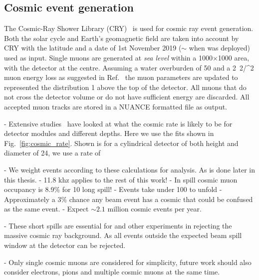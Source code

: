 \subsection{Cosmic event generation} %
\label{sec:chips_monte_carlo_cosmic} %

The Cosmic-Ray Shower Library (CRY)~\cite{hagmann2012_1, hagmann2012_2} is used for cosmic ray
event generation. Both the solar cycle and Earth's geomagnetic field are taken into account by CRY
with the \chipsfive latitude and a date of 1st November 2019 ($\sim$ when \chipsfive was deployed)
used as input. Single muons are generated at \emph{sea level} within a
\unit{1000}{}$\times$\unit{1000}{} area, with the detector at the centre.
Assuming a \chipsfive water overburden of \unit{50}{} and a
\unit{2.2}{\MeV/^{2}} muon energy loss as suggested in Ref.~\cite{klimushin2001} the
muon parameters are updated to represented the distribution \unit{1}{} above the top of
the detector. All muons that do not cross the detector volume or do not have sufficient energy are
discarded. All accepted muon tracks are stored in a NUANCE formatted file as output.

- Extensive studies~\cite{son2013} have looked at what the cosmic rate is likely to be for \chips
detector modules and different depths. Here we use the fits shown in Fig.~\ref{fig:cosmic_rate}.
Shown is for a cylindrical detector of both height and diameter of \unit{24}{}, we use a
rate of

- We weight events according to these calculations for analysis. As is done later in this thesis.
- 11.8 khz applies to the rest of this work!
- In spill cosmic muon occupancy is 8.9\% for \unit{10}{\mu{}} long \numi spill!
- Events take under \unit{100}{\mu{}} to unfold
- Approximately a 3\% chance any beam event has a cosmic that could be confused as the same event.
- Expect $\sim2.1$ million cosmic events per year.

- These short spills are essential for \chips and other experiments in rejecting the massive
cosmic ray background. As all events outside the expected beam spill window at the detector can be
rejected.

- Only single cosmic muons are considered for simplicity, future work should also consider
electrons, pions and multiple cosmic muons at the same time.

